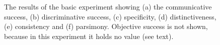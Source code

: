 \begin{figure}
\centering
{}
\\
\\
\caption{The results of the basic experiment showing (a) the communicative success, (b) discriminative success, (c) specificity, (d) distinctiveness, (e) consistency and (f) parsimony. Objective success is not shown, because in this experiment it holds no value (see text).}
\label{f:st:plot}
\end{figure}


